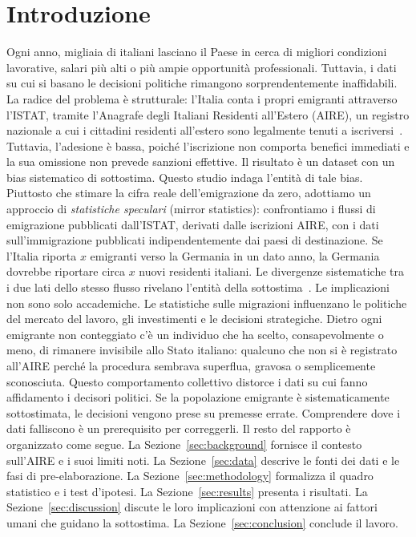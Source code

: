 \section{Introduzione}
Ogni anno, migliaia di italiani lasciano il Paese in cerca di migliori condizioni lavorative, salari più alti o più ampie opportunità professionali.
Tuttavia, i dati su cui si basano le decisioni politiche rimangono sorprendentemente inaffidabili.
La radice del problema è strutturale: l'Italia conta i propri emigranti attraverso l'ISTAT, tramite l'Anagrafe degli Italiani Residenti all'Estero (AIRE), un registro nazionale a cui i cittadini residenti all'estero sono legalmente tenuti a iscriversi~\cite{legge470_1988}.
Tuttavia, l'adesione è bassa, poiché l'iscrizione non comporta benefici immediati e la sua omissione non prevede sanzioni effettive.
Il risultato è un dataset con un bias sistematico di sottostima.
Questo studio indaga l'entità di tale bias.
Piuttosto che stimare la cifra reale dell'emigrazione da zero, adottiamo un approccio di \emph{statistiche speculari} (mirror statistics): confrontiamo i flussi di emigrazione pubblicati dall'ISTAT, derivati dalle iscrizioni AIRE, con i dati sull'immigrazione pubblicati indipendentemente dai paesi di destinazione.
Se l'Italia riporta $x$ emigranti verso la Germania in un dato anno, la Germania dovrebbe riportare circa $x$ nuovi residenti italiani.
Le divergenze sistematiche tra i due lati dello stesso flusso rivelano l'entità della sottostima~\cite{abel_cohen2019}.
Le implicazioni non sono solo accademiche.
Le statistiche sulle migrazioni influenzano le politiche del mercato del lavoro, gli investimenti e le decisioni strategiche.
Dietro ogni emigrante non conteggiato c'è un individuo che ha scelto, consapevolmente o meno, di rimanere invisibile allo Stato italiano: qualcuno che non si è registrato all'AIRE perché la procedura sembrava superflua, gravosa o semplicemente sconosciuta.
Questo comportamento collettivo distorce i dati su cui fanno affidamento i decisori politici.
Se la popolazione emigrante è sistematicamente sottostimata, le decisioni vengono prese su premesse errate.
Comprendere dove i dati falliscono è un prerequisito per correggerli.
Il resto del rapporto è organizzato come segue.
La Sezione~\ref{sec:background} fornisce il contesto sull'AIRE e i suoi limiti noti.
La Sezione~\ref{sec:data} descrive le fonti dei dati e le fasi di pre-elaborazione.
La Sezione~\ref{sec:methodology} formalizza il quadro statistico e i test d'ipotesi.
La Sezione~\ref{sec:results} presenta i risultati.
La Sezione~\ref{sec:discussion} discute le loro implicazioni con attenzione ai fattori umani che guidano la sottostima.
La Sezione~\ref{sec:conclusion} conclude il lavoro.
